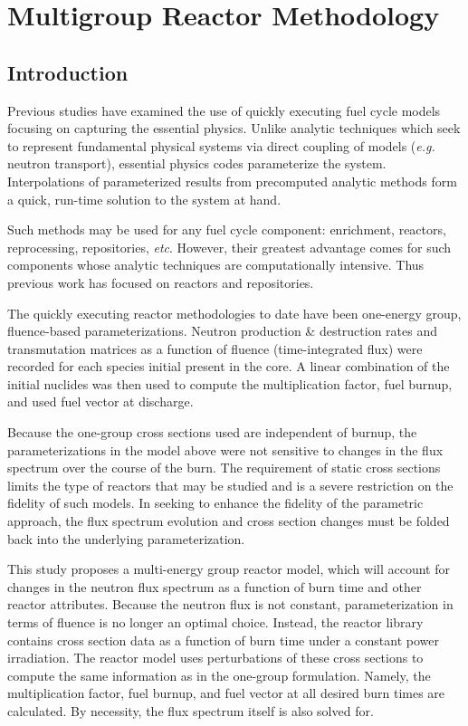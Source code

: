 \chapter{Multigroup Reactor Methodology}
\label{mg_paper}

\section{Introduction}
\label{mg_sec:intro}
Previous studies have examined the use of quickly executing fuel cycle models focusing on capturing 
the essential physics.  Unlike analytic techniques which seek to represent  
fundamental physical systems via direct coupling of models (\emph{e.g.} neutron transport), 
essential physics codes parameterize the system.   Interpolations
of parameterized results from precomputed analytic methods form a quick, run-time solution to the system at hand.

Such methods may be used for any fuel cycle component: enrichment, reactors, reprocessing, 
repositories, \emph{etc}.  However, their greatest advantage comes for such components whose analytic
techniques are computationally intensive.  Thus previous work has focused on reactors and repositories.

The quickly executing reactor methodologies to date have been one-energy group, fluence-based parameterizations.
Neutron production \& destruction rates and transmutation matrices as a function of fluence 
(time-integrated flux) were recorded for each species initial present in the core.  A linear combination of 
the initial nuclides was then used to compute the multiplication factor, fuel burnup, and used fuel 
vector at discharge.

Because the one-group cross sections used are independent of burnup,
the parameterizations in the model above were not sensitive to changes in the flux spectrum over the 
course of the burn.  The requirement of static cross sections limits the type of reactors that may be 
studied and is a severe restriction on the fidelity of such models.  In seeking to enhance
the fidelity of the parametric approach, the flux spectrum evolution and 
cross section changes must be folded back into the underlying parameterization.

This study proposes a multi-energy group reactor model, which will account for changes in the neutron
flux spectrum as a function of burn time and other reactor attributes.  Because the neutron flux is not constant, 
parameterization in terms of fluence is no longer an optimal choice.  Instead, the reactor library 
contains cross section data as a function of burn time under a constant power irradiation.  The reactor model 
uses perturbations of these cross sections to compute the same information as in the one-group 
formulation.  Namely, the multiplication factor, fuel burnup, and fuel vector at all desired burn times
are calculated.  By necessity, the flux spectrum itself is also solved for.

